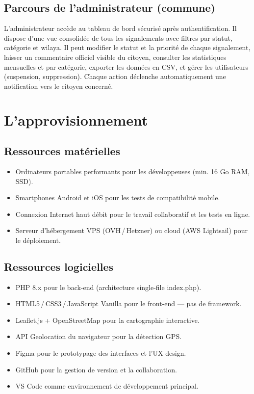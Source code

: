 \documentclass[12pt,a4paper]{report}
\begin{document}
\subsection{Parcours de l'administrateur (commune)}

L'administrateur accède au tableau de bord sécurisé après authentification. Il
dispose d'une vue consolidée de tous les signalements avec filtres par statut,
catégorie et wilaya. Il peut modifier le statut et la priorité de chaque
signalement, laisser un commentaire officiel visible du citoyen, consulter les
statistiques mensuelles et par catégorie, exporter les données en CSV, et gérer
les utilisateurs (suspension, suppression). Chaque action déclenche
automatiquement une notification vers le citoyen concerné.

\section{L'approvisionnement}

\subsection{Ressources matérielles}
\begin{itemize}
  \item Ordinateurs portables performants pour les développeuses (min. 16 Go
        RAM, SSD).
  \item Smartphones Android et iOS pour les tests de compatibilité mobile.
  \item Connexion Internet haut débit pour le travail collaboratif et les tests
        en ligne.
  \item Serveur d'hébergement VPS (OVH\,/\,Hetzner) ou cloud (AWS Lightsail)
        pour le déploiement.
\end{itemize}

\subsection{Ressources logicielles}
\begin{itemize}
  \item PHP 8.x pour le back-end (architecture single-file index.php).
  \item HTML5\,/\,CSS3\,/\,JavaScript Vanilla pour le front-end — pas de
        framework.
  \item Leaflet.js + OpenStreetMap pour la cartographie interactive.
  \item API Geolocation du navigateur pour la détection GPS.
  \item Figma pour le prototypage des interfaces et l'UX design.
  \item GitHub pour la gestion de version et la collaboration.
  \item VS Code comme environnement de développement principal.
\end{itemize}
\end{document}
